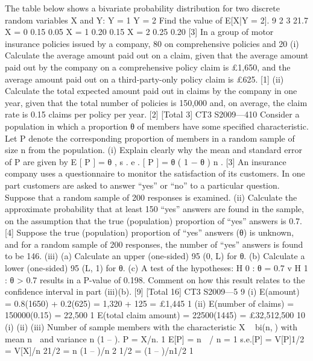 \documentclass[a4paper,12pt]{article}
\begin{document}
\begin{enumerate}
[Total 8]
The table below shows a bivariate probability distribution for two discrete random
variables X and Y:
Y = 1
Y = 2
Find the value of E[X|Y = 2].
9
2
3
21.7
X = 0
0.15
0.05
X = 1
0.20
0.15
X = 2
0.25
0.20
[3]
In a group of motor insurance policies issued by a company, 80%
on comprehensive policies and 20%
(i) Calculate the average amount paid out on a claim, given that the average
amount paid out by the company on a comprehensive policy claim is £1,650,
and the average amount paid out on a third-party-only policy claim is £625.
[1]
(ii) Calculate the total expected amount paid out in claims by the company in one
year, given that the total number of policies is 150,000 and, on average, the
claim rate is 0.15 claims per policy per year.
[2]
[Total 3]
CT3 S2009—410
Consider a population in which a proportion θ of members have some specified
characteristic. Let P denote the corresponding proportion of members in a random
sample of size n from the population.
(i)
Explain clearly why the mean and standard error of P are given by
E [ P ] = θ ,
s . e . [ P ] =
θ ( 1 − θ )
n
.
[3]
An insurance company uses a questionnaire to monitor the satisfaction of its
customers.
In one part customers are asked to answer “yes” or “no” to a particular question.
Suppose that a random sample of 200 responses is examined.
(ii)
Calculate the approximate probability that at least 150 “yes” answers are
found in the sample, on the assumption that the true (population) proportion of
“yes” answers is 0.7.
[4]
Suppose the true (population) proportion of “yes” answers (θ) is unknown, and for a
random sample of 200 responses, the number of “yes” answers is found to be 146.
(iii)
(a) Calculate an upper (one-sided) 95%
(0, L) for θ.
(b) Calculate a lower (one-sided) 95%
(L, 1) for θ.
(c) A test of the hypotheses:
H 0 : θ = 0.7 v H 1 : θ > 0.7
results in a P-value of 0.198.
Comment on how this result relates to the confidence interval in part
(iii)(b).
[9]
[Total 16]
CT3 S2009—5
9
(i) E(amount) = 0.8(1650) + 0.2(625) = 1,320 + 125 = £1,445 1
(ii) E(number of claims) = 150000(0.15) = 22,500 1
E(total claim amount) = 22500(1445) = £32,512,500
10
(i)
(ii)
(iii)
Number of sample members with the characteristic X ~ bi(n,) with mean
n  and variance n (1 – ). P = X/n. 1
E[P] = n  / n = 1
s.e.[P] = {V[P]}1/2 = {V[X]/n 2}1/2 = {n (1 – )/n 2 }1/2 = { (1 – )/n}1/2 1

\end{enumerate}
\end{document}
